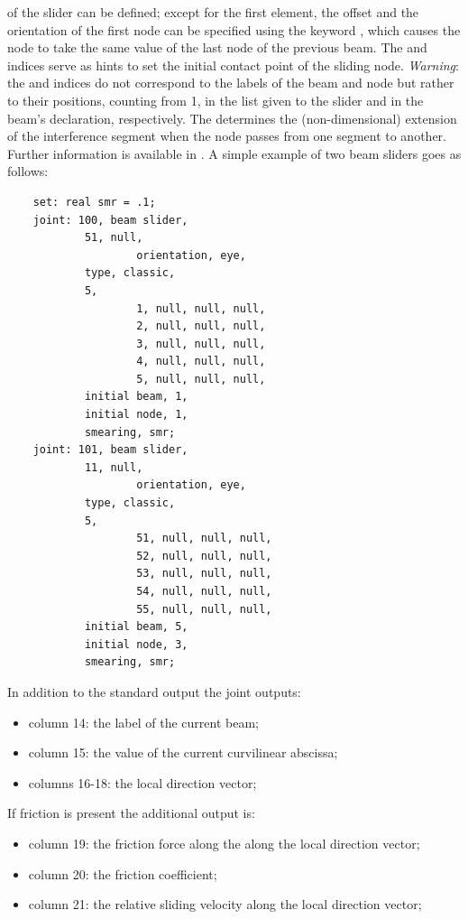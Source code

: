 of the slider can be defined; except for the first element, the
offset and the orientation of the first node can be specified using
the keyword , which causes the node to take the same
value of the last node of the previous beam.
The  and  indices
serve as hints to set the initial contact point of the sliding node.
\textit{Warning}: the  and 
indices do not correspond to the labels of the beam 
and node but rather to their positions, counting from 1,
in the list given to the slider
and in the beam's declaration, respectively.
The  determines the (non-dimensional) extension
of the interference segment when the node passes from one segment
to another.
Further information is available in \cite{SLIDER-AIDAA-2003}.
A simple example of two beam sliders goes as follows:
\begin{verbatim}
    set: real smr = .1;
    joint: 100, beam slider,
            51, null,
                    orientation, eye,
            type, classic,
            5,
                    1, null, null, null,
                    2, null, null, null,
                    3, null, null, null,
                    4, null, null, null,
                    5, null, null, null,
            initial beam, 1,
            initial node, 1,
            smearing, smr;
    joint: 101, beam slider,
            11, null,
                    orientation, eye,
            type, classic,
            5,
                    51, null, null, null,
                    52, null, null, null,
                    53, null, null, null,
                    54, null, null, null,
                    55, null, null, null,
            initial beam, 5,
            initial node, 3,
            smearing, smr;
\end{verbatim}
In addition to the standard output the  joint outputs:
\begin{itemize}
\item column 14: the label of the current beam;
\item column 15: the value of the current curvilinear abscissa;
\item columns 16-18: the local direction vector;
\end{itemize}
If friction is present the additional output is:
\begin{itemize}
\item column 19: the friction force along the along the local direction vector;
\item column 20: the friction coefficient;
\item column 21: the relative sliding velocity along the local direction vector;
\end{itemize}


